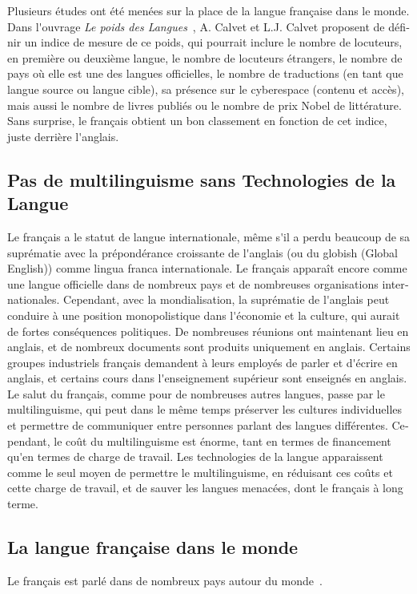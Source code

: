 \begin{french}
\begin{multicols}{2}
Plusieurs études ont été menées sur la place de la langue française
dans le monde. Dans l{\mbox '}ouvrage {\em Le poids des
  Langues}~\cite{calvet09}, A. Calvet et L.J. Calvet proposent de
définir un indice de mesure de ce poids, qui pourrait inclure le
nombre de locuteurs, en première ou deuxième langue, le nombre de
locuteurs étrangers, le nombre de pays où elle est une des langues
officielles, le nombre de traductions (en tant que langue source ou
langue cible), sa présence sur le cyberespace (contenu et accès), mais
aussi le nombre de livres publiés ou le nombre de prix Nobel de
littérature. Sans surprise, le français obtient un bon classement en
fonction de cet indice, juste derrière l{\mbox '}anglais.

\subsection{Pas de multilinguisme sans Technologies de la Langue}

Le français a le statut de langue internationale, même s{\mbox '}il a
perdu beaucoup de sa suprématie avec la prépondérance croissante de
l{\mbox '}anglais (ou du globish (Global English)) comme lingua franca
internationale. Le français apparaît encore comme une langue
officielle dans de nombreux pays et de nombreuses organisations
internationales. Cependant, avec la mondialisation, la suprématie de
l{\mbox '}anglais peut conduire à une position monopolistique dans
l{\mbox '}économie et la culture, qui aurait de fortes conséquences
politiques. De nombreuses réunions ont maintenant lieu en anglais, et
de nombreux documents sont produits uniquement en anglais. Certains
groupes industriels français demandent à leurs employés de parler 
et d{\mbox '}écrire en anglais, et certains cours dans l{\mbox
  '}enseignement supérieur sont enseignés en anglais. Le salut du
français, comme pour de nombreuses autres langues, passe par le
multilinguisme, qui peut dans le même temps préserver les cultures
individuelles et permettre de communiquer entre personnes parlant
des langues différentes. Cependant, le coût du multilinguisme est
énorme, tant en termes de financement qu{\mbox '}en termes de charge
de travail. Les technologies de la langue apparaissent comme le seul
moyen de permettre le multilinguisme, en réduisant ces coûts et cette 
charge de travail, et de sauver les langues menacées, dont le français
à long terme.

\subsection{La langue française dans le monde}
\label{frenchInTheWorld}
Le français est parlé dans de nombreux pays autour du
monde~\cite{francaisautourmonde}.


\end{multicols}
\end{french}
